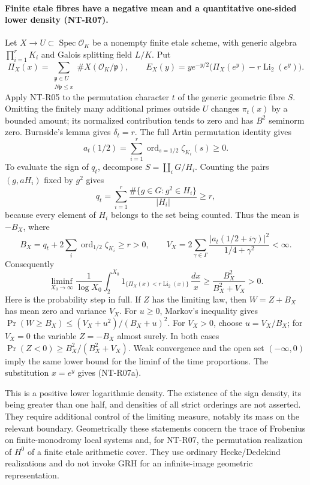 \paragraph{Finite etale fibres have a negative mean and a quantitative
one-sided lower density (NT-R07).}
Let $X\to U\subset\operatorname{Spec}\mathcal O_K$ be a nonempty
finite etale scheme, with generic algebra $\prod_{i=1}^r K_i$ and
Galois splitting field $L/K$. Put
\[
 \Pi_X(x)=\sum_{\substack{\mathfrak p\in U\\N\mathfrak p\le x}}
                         \#X(\mathcal O_K/\mathfrak p),\qquad
 E_X(y)=ye^{-y/2}\bigl(\Pi_X(e^y)-r\operatorname{Li}_2(e^y)\bigr).
\]
Apply NT-R05 to the permutation character $t$ of the generic
geometric fibre $S$. Omitting the finitely many additional primes
outside $U$ changes $\pi_t(x)$ by a bounded amount; its normalized
contribution tends to zero and has $B^2$ seminorm zero. Burnside's
lemma gives $\delta_t=r$. The full Artin permutation identity gives
\[
 a_t(1/2)=\sum_{i=1}^r\operatorname{ord}_{s=1/2}\zeta_{K_i}(s)
       \ge0.
\]
To evaluate the sign of $q_t$, decompose $S=\coprod_iG/H_i$.
Counting the pairs $(g,aH_i)$ fixed by $g^2$ gives
\[
 q_t=\sum_{i=1}^r
      \frac{\#\{g\in G:g^2\in H_i\}}{|H_i|}\ge r,
\]
because every element of $H_i$ belongs to the set being counted.
Thus the mean is $-B_X$, where
\[
 B_X=q_t+2\sum_i\operatorname{ord}_{1/2}\zeta_{K_i}\ge r>0,
 \qquad
 V_X=2\sum_{\gamma\in\Gamma}
          \frac{|a_t(1/2+i\gamma)|^2}{1/4+\gamma^2}<\infty.
\]
Consequently
\[
 \liminf_{X_0\to\infty}\frac1{\log X_0}
 \int_2^{X_0}
 1_{\{\Pi_X(x)<r\operatorname{Li}_2(x)\}}\,\frac{dx}{x}
       \ge\frac{B_X^2}{B_X^2+V_X}>0.
 \tag{NT-R07a}
\]
Here is the probability step in full. If $Z$ has the limiting law,
then $W=Z+B_X$ has mean zero and variance $V_X$. For $u\ge0$,
Markov's inequality gives
$\Pr(W\ge B_X)\le(V_X+u^2)/(B_X+u)^2$.
For $V_X>0$, choose $u=V_X/B_X$; for $V_X=0$ the variable
$Z=-B_X$ almost surely. In both cases
$\Pr(Z<0)\ge B_X^2/(B_X^2+V_X)$.
Weak convergence and the open set $(-\infty,0)$ imply the same
lower bound for the liminf of the time proportions. The substitution
$x=e^y$ gives (NT-R07a).

This is a positive lower logarithmic density. The existence of the
sign density, its being greater than one half, and densities of all
strict orderings are not asserted. They require additional control
of the limiting measure, notably its mass on the relevant boundary.
Geometrically these statements concern the trace of Frobenius on
finite-monodromy local systems and, for NT-R07, the permutation
realization of $H^0$ of a finite etale arithmetic cover. They use
ordinary Hecke/Dedekind realizations and do not invoke GRH for an
infinite-image geometric representation.

